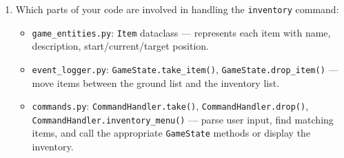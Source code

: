\documentclass[11pt]{article}
\begin{document}
\begin{enumerate}
    \item Which parts of your code are involved in handling the \verb|inventory| command:
    \begin{itemize}
        \item \verb|game_entities.py|: \verb|Item| dataclass --- represents each item with name, description, start/current/target position.
        \item \verb|event_logger.py|: \verb|GameState.take_item()|, \verb|GameState.drop_item()| --- move items between the ground list and the inventory list.
        \item \verb|commands.py|: \verb|CommandHandler.take()|, \verb|CommandHandler.drop()|, \verb|CommandHandler.inventory_menu()| --- parse user input, find matching items, and call the appropriate \verb|GameState| methods or display the inventory.
    \end{itemize}
\end{enumerate}
\end{document}
